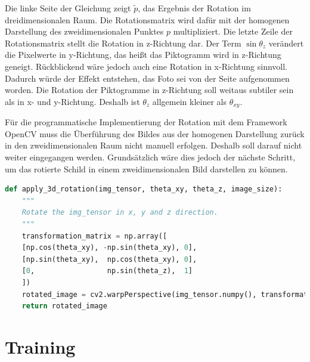 Die linke Seite der Gleichung zeigt $\tilde{p}$, das Ergebnis der Rotation im dreidimensionalen Raum. Die Rotationsmatrix wird dafür mit der homogenen Darstellung des zweidimensionalen Punktes $p$ multipliziert. Die letzte Zeile der Rotationsmatrix stellt die Rotation in z-Richtung dar. Der Term $\sin{\theta_{z}}$ verändert die Pixelwerte in y-Richtung, das heißt das Piktogramm wird in z-Richtung geneigt. Rückblickend wäre jedoch auch eine Rotation in x-Richtung sinnvoll. Dadurch würde der Effekt entstehen, das Foto sei von der Seite aufgenommen worden. Die Rotation der Piktogramme in z-Richtung soll weitaus subtiler sein als in x- und y-Richtung. Deshalb ist $\theta_{z}$ allgemein kleiner als $\theta_{xy}$. \cite{geometric-ops}

Für die programmatische Implementierung der Rotation mit dem Framework OpenCV muss die Überführung des Bildes aus der homogenen Darstellung zurück in den zweidimensionalen Raum nicht manuell erfolgen. Deshalb soll darauf nicht weiter eingegangen werden. Grundsätzlich wäre dies jedoch der nächste Schritt, um das rotierte Schild in einem zweidimensionalen Bild darstellen zu können.


\begin{lstlisting}[language=Python, caption={Rotation der Piktograme mit OpenCV}]
def apply_3d_rotation(img_tensor, theta_xy, theta_z, image_size):
    """
    Rotate the img_tensor in x, y and z direction.
    """
    transformation_matrix = np.array([
    [np.cos(theta_xy), -np.sin(theta_xy), 0],
    [np.sin(theta_xy),  np.cos(theta_xy), 0],
    [0,                 np.sin(theta_z),  1] 
    ])
    rotated_image = cv2.warpPerspective(img_tensor.numpy(), transformation_matrix, (image_size, image_size))
    return rotated_image    
\end{lstlisting}

\section{Training}
